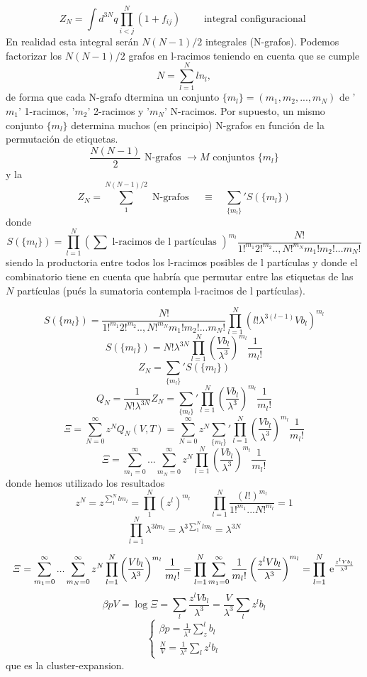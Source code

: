 \documentclass[10pt,oneside]{CBFT_book}
\begin{document}
\[
	Z_N = \int d^{3N}q \prod_{i<j}^N (1+f_{ij}) \qquad \text{ integral configuracional }
\]
En realidad esta integral serán $ N(N-1)/2 $ integrales (N-grafos). Podemos factorizar los $ N(N-1)/2 $ grafos
en l-racimos teniendo en cuenta que se cumple
\[
	N = \sum_{l=1}^N ln_l,
\]
de forma que cada N-grafo dtermina un conjunto $ \{ m_l \} = (m_1,m_2, ..., m_N) $ de '$m_1$' 1-racimos, '$m_2$' 
2-racimos y '$m_N$' N-racimos. Por supuesto, un mismo conjunto $ \{ m_l \} $ determina muchos (en principio) N-grafos 
en función de la permutación de etiquetas.
\[
	\frac{N(N-1)}{2} \text{ N-grafos } \rightarrow M \text{ conjuntos } \{ m_l \}
\]
y la 
\[
	Z_N = \sum_1^{N(N-1)/2 } \text{ N-grafos } \quad \equiv \quad \sum_ {\{ m_l \}}' S(\{ m_l \})
\]
donde 
\[
	S(\{ m_l \}) = \prod_{l=1}^N \left( \sum \text{ l-racimos de l partículas }\right)^{m_l}
	\frac{N!}{ 1!^{m_1} 2!^{m_2} ..,N!^{m_N} m_1! m_2! ... m_N!}
\]
siendo la productoria entre todos los l-racimos posibles de l partículas y donde el combinatorio tiene en cuenta que 
habría que permutar entre las etiquetas de las $N$ partículas (pués la sumatoria contempla l-racimos de l partículas).

\[
	S(\{ m_l \}) = \frac{N!}{ 1!^{m_1} 2!^{m_2} ..,N!^{m_N} m_1! m_2! ... m_N!} \prod_{l=1}^N
	( l! \lambda^{3(l-1)}Vb_l )^{m_l} 
\]
\[
	S(\{ m_l \}) = N! \lambda^{3N} \prod_{l=1}^N \left( \frac{Vb_l}{\lambda^3}\right)^{m_l}\frac{1}{m_l!}
\]
\[
	Z_N = \sum_ {\{ m_l \}}' S(\{ m_l \})
\]
\[
	Q_N = \frac{1}{N! \lambda^{3N}} Z_N = \sum_ {\{ m_l \}}' \prod_{l=1}^N 
	\left( 	\frac{Vb_l}{\lambda^3}\right)^{m_l}\frac{1}{m_l!}
\]
\[
	\Xi = \sum_{N=0}^\infty z^N Q_N(V,T) = \sum_{N=0}^\infty z^N \sum_ {\{ m_l \}}' \prod_{l=1}^N 
	\left( 	\frac{Vb_l}{\lambda^3}\right)^{m_l}\frac{1}{m_l!}
\]
\[
	\Xi = \sum_ {m_1=0}^\infty ... \sum_ {m_N=0}^\infty   z^N \prod_{l=1}^N 
	\left( 	\frac{Vb_l}{\lambda^3}\right)^{m_l}\frac{1}{m_l!}
\]
donde hemos utilizado los resultados
\[
	z^N = z^{\sum_1^N l m_l } = \prod_1^N (z^l)^{m_l} \qquad 
	\prod_{l=1}^N \frac{(l!)^{m_l}}{1!^{m_1}...N!^{m_l}} = 1
\]
\[
	\prod_{l=1}^N  \lambda^{3lm_l} = \lambda^{3\sum_1^N lm_l} = \lambda^{3N}
\]

\[
	\Xi = \sum_ {m_1=0}^\infty ... \sum_ {m_N=0}^\infty   z^N \prod_{l=1}^N 
	\left( 	\frac{Vb_l}{\lambda^3}\right)^{m_l}\frac{1}{m_l!} = 
	\prod_{l=1}^N  \sum_ {m_1=0}^\infty \frac{1}{m_l!} \left( \frac{z^l Vb_l}{\lambda^3}\right)^{m_l} =
	\prod_{l=1}^N  \:\mathrm{e}^{ \frac{z^l Vb_l}{\lambda^3} } 
\]
\[
	\beta pV = \log \Xi = \sum_l \frac{z^l V b_l}{\lambda^3} = \frac{V}{\lambda^3} \sum_l z^l b_l
\]
\[
	\begin{cases}
	\beta p = \frac{1}{\lambda^3} \sum_z^l b_l \\
	\frac{N}{V} = \frac{1}{\lambda^3} \sum_l z^l b_l
	\end{cases}
\]
que es la cluster-expansion.
\end{document}
